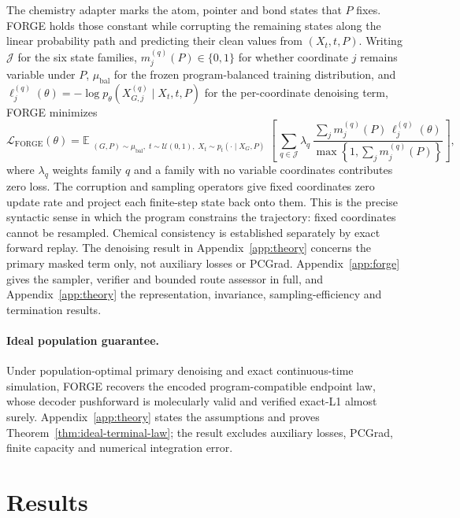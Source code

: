 \documentclass{article}
\begin{document}
The chemistry adapter marks the atom, pointer and bond states that $P$ fixes. FORGE holds those
constant while corrupting the remaining states along the linear probability path and predicting their
clean values from $(X_t,t,P)$. Writing $\mathscr J$ for the six state families,
$m_j^{(q)}(P)\in\{0,1\}$ for whether coordinate $j$ remains variable under $P$,
$\mu_{\mathrm{bal}}$ for the frozen program-balanced training distribution, and
$\ell^{(q)}_j(\theta)=-\log p_\theta(X_{G,j}^{(q)}\mid X_t,t,P)$ for the per-coordinate denoising
term, FORGE minimizes
\begin{equation}
    \mathcal{L}_{\mathrm{FORGE}}(\theta)
    = \mathbb{E}_{\substack{
        (G,P)\sim\mu_{\mathrm{bal}},\;
        t\sim\mathcal{U}(0,1),\;
        X_t\sim p_t(\cdot\mid X_G,P)}}
    \left[\,
        \sum_{q\in\mathscr J}
        \lambda_q\,
        \frac{\sum_j m_j^{(q)}(P)\,\ell^{(q)}_j(\theta)}
        {\max\!\left\{1,\sum_j m_j^{(q)}(P)\right\}}
    \right],
\end{equation}
where $\lambda_q$ weights family $q$ and a family with no variable coordinates contributes zero loss.
The corruption and sampling operators give fixed coordinates zero update rate and project each
finite-step state back onto them. This is the precise syntactic sense in which the program constrains
the trajectory: fixed coordinates cannot be resampled. Chemical consistency is established
separately by exact forward replay. The denoising result in Appendix~\ref{app:theory} concerns the
primary masked term only, not auxiliary losses or PCGrad. Appendix~\ref{app:forge} gives the sampler,
verifier and bounded route
assessor in full, and Appendix~\ref{app:theory} the representation, invariance, sampling-efficiency
and termination results.

\paragraph{Ideal population guarantee.}
Under population-optimal primary denoising and exact continuous-time simulation, FORGE recovers the
encoded program-compatible endpoint law, whose decoder pushforward is molecularly valid and verified
exact-L1 almost surely. Appendix~\ref{app:theory} states the assumptions and proves
Theorem~\ref{thm:ideal-terminal-law}; the result excludes auxiliary losses, PCGrad, finite capacity
and numerical integration error.

\section{Results}
\end{document}
